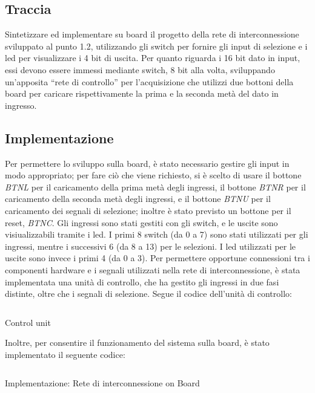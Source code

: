 \subsection{Traccia}
 Sintetizzare ed implementare su board il progetto della rete di interconnessione sviluppato al punto 1.2, utilizzando gli switch per fornire gli input di selezione e i led per visualizzare i 4 bit di uscita. Per quanto riguarda i 16 bit dato in input, essi devono essere immessi mediante switch, 8 bit alla volta, sviluppando un’apposita 
“rete di controllo” per l’acquisizione che utilizzi due bottoni della board per caricare rispettivamente la prima e la seconda metà del dato in ingresso.
\subsection{Implementazione}
Per permettere lo sviluppo sulla board, è stato necessario gestire gli input in modo appropriato; per fare ciò che viene richiesto, si è scelto di usare il bottone \textit{BTNL} per il caricamento della prima metà degli ingressi, il bottone \textit{BTNR} per il caricamento della seconda metà degli ingressi, e il bottone \textit{BTNU} per il caricamento dei segnali di selezione; inoltre è stato previsto un bottone per il reset, \textit{BTNC}. Gli ingressi sono stati gestiti con gli switch, e le uscite sono visiualizzabili tramite i led. I primi 8 switch (da 0 a 7) sono stati utilizzati per gli ingressi, mentre i successivi 6 (da 8 a 13) per le selezioni. I led utilizzati per le uscite sono invece i primi 4 (da 0 a 3).
Per permettere opportune connessioni tra i componenti hardware e i segnali utilizzati nella rete di interconnessione, è stata implementata una unità di controllo, che ha gestito gli ingressi in due fasi distinte, oltre che i segnali di selezione.
Segue il codice dell'unità di controllo:
\begin{code}
    \inputminted[frame=lines, framesep=2mm, baselinestretch=1.2, bgcolor=LightGray, fontsize=\footnotesize, linenos]{vhdl}{vhdl_files/control_unit.vhd}
    \caption{Control unit}
    \label{lst: c_unit}
\end{code}
Inoltre, per consentire il funzionamento del sistema sulla board, è stato implementato il seguente codice:
\begin{code}
    \inputminted[frame=lines, framesep=2mm, baselinestretch=1.2, bgcolor=LightGray, fontsize=\footnotesize, linenos]{vhdl}{vhdl_files/interc_16_4onBoard.vhd}
    \caption{Implementazione: Rete di interconnessione on Board}
    \label{lst: R_i_onBoard}
\end{code}
